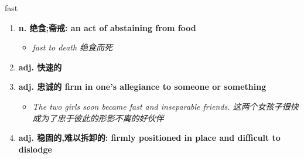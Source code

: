 
\begin{frame}
{\huge fast}
\begin{center}
\begin{enumerate}\Large
  \item \textbf{n. 绝食;斋戒: an act of abstaining from food}
  \begin{itemize}
    \item \em{\Large{fast to death 绝食而死}}
  \end{itemize}
  \item \textbf{adj. 快速的}
  \item \textbf{adj. 忠诚的 firm in one's allegiance to someone or something}
  \begin{itemize}
    \item \em{\Large{The two girls soon became fast and inseparable friends. 这两个女孩子很快成为了忠于彼此的形影不离的好伙伴}}
  \end{itemize}
  \item \textbf{adj. 稳固的,难以拆卸的: firmly positioned in place and difficult to dislodge}
\end{enumerate}
\end{center}
\end{frame}
